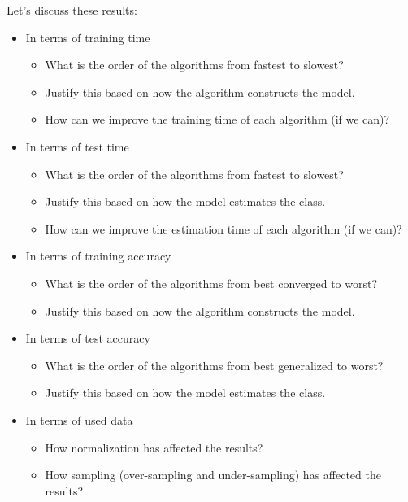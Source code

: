 \documentclass[11pt, a4paper]{article}
\begin{document}
\begin{multicols}{2}
Let's discuss these results:
\begin{itemize}
	\item In terms of training time
	\begin{itemize}
		\item What is the order of the algorithms from fastest to slowest?
		\item Justify this based on how the algorithm constructs the model.
		\item How can we improve the training time of each algorithm (if we can)?
	\end{itemize}
	\item In terms of test time
	\begin{itemize}
		\item What is the order of the algorithms from fastest to slowest?
		\item Justify this based on how the model estimates the class.
		\item How can we improve the estimation time of each algorithm (if we can)?
	\end{itemize}
	\item In terms of training accuracy
	\begin{itemize}
		\item What is the order of the algorithms from best converged to worst?
		\item Justify this based on how the algorithm constructs the model.
	\end{itemize}
	\item In terms of test accuracy
	\begin{itemize}
		\item What is the order of the algorithms from best generalized to worst?
		\item Justify this based on how the model estimates the class.
	\end{itemize}
	\item In terms of used data
	\begin{itemize}
		\item How normalization has affected the results?
		\item How sampling (over-sampling and under-sampling) has affected the results?
	\end{itemize}
\end{itemize}

\end{multicols}
\end{document}
